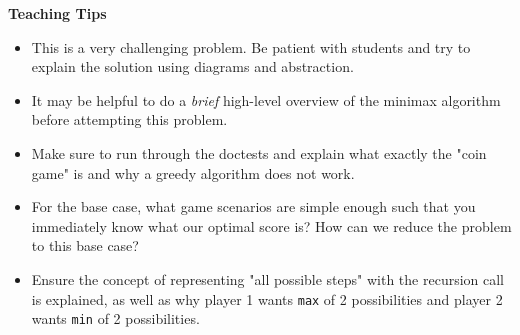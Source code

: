 \begin{guide}
\begin{blocksection}
   \textbf{Teaching Tips}
   \begin{itemize}
   	   \item This is a very challenging problem. Be patient with students and try to explain the solution using diagrams and abstraction.
   	   \item It may be helpful to do a \textit{brief} high-level overview of the minimax algorithm before attempting this problem.
       \item Make sure to run through the doctests and explain what exactly the "coin game" is and why a greedy algorithm does not work.
       \item For the base case, what game scenarios are simple enough such that you immediately know what our optimal score is? How can we reduce the problem to this base case?
       \item Ensure the concept of representing "all possible steps" with the recursion call is explained, as well as why player 1 wants \verb|max| of 2 possibilities and player 2 wants \verb|min| of 2 possibilities.
   \end{itemize}
\end{blocksection}
\end{guide}
